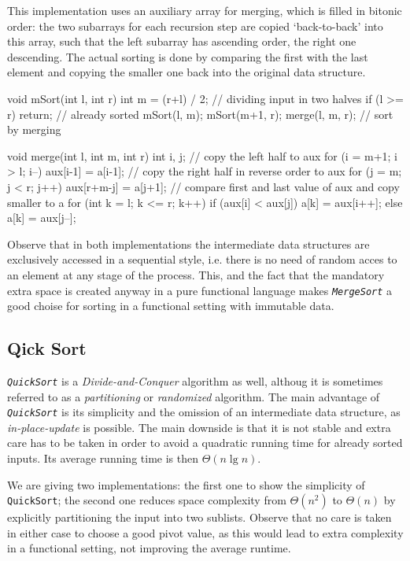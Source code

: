 \begin{impl}
This implementation uses an auxiliary array for merging, which is filled in bitonic order:
the two subarrays for each recursion step are copied `back-to-back' into this array, such that the left subarray has ascending order, the right one descending.
The actual sorting is done by comparing the first with the last element and copying the smaller one back into the original data structure.
\end{impl}

\begin{javacode}
void mSort(int l, int r) {
    int m = (r+l) / 2; // dividing input in two halves
    if (l >= r) return; // already sorted
    mSort(l, m);
    mSort(m+1, r);
    merge(l, m, r); // sort by merging
}

void merge(int l, int m, int r) {
    int i, j;
    // copy the left half to aux
    for (i = m+1; i > l; i--) aux[i-1] = a[i-1];
    // copy the right half in reverse order to aux
    for (j = m; j < r; j++) aux[r+m-j] = a[j+1];
    // compare first and last value of aux and copy smaller to a
    for (int k = l; k <= r; k++) {
        if (aux[i] < aux[j]) a[k] = aux[i++];
        else a[k] = aux[j--];
    }
}
\end{javacode}

Observe that in both implementations the intermediate data structures are exclusively accessed in a sequential style, i.e. there is no need of random acces to an element at any stage of the process.
This, and the fact that the mandatory extra space is created anyway in a pure functional language makes \emph{\texttt{MergeSort}} a good choise for sorting in a functional setting with immutable data.

\subsection{Qick Sort}

\emph{\texttt{QuickSort}} is a \emph{Divide-and-Conquer} algorithm as well, althoug it is sometimes referred to as a \emph{partitioning} or \emph{randomized} algorithm.
The main advantage of \emph{\texttt{QuickSort}} is its simplicity and the omission of an intermediate data structure, as \emph{in-place-update} is possible.
The main downside is that it is not stable and extra care has to be taken in order to avoid a quadratic running time for already sorted inputs. Its average running time is then $\Theta (n \lg n)$.

\begin{impl} \label{impl:qshaskell}
We are giving two implementations: the first one to show the simplicity of \texttt{QuickSort}; the second one reduces space complexity from $\Theta (n^2)$ to $\Theta (n)$ by explicitly partitioning the input into two sublists.
Observe that no care is taken in either case to choose a good pivot value, as this would lead to extra complexity in a functional setting, not improving the average runtime.
\end{impl}

